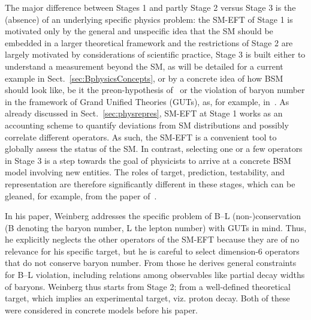 The major difference between Stages 1 and partly Stage 2 versus Stage 3 is the (absence) of an underlying specific physics problem:
the SM-EFT of Stage 1 is motivated only by the general and unspecific idea that the SM should be embedded in a larger theoretical framework and the restrictions of Stage 2 are largely motivated by considerations of scientific practice, Stage 3 is built either to understand a measurement beyond the SM, as will be detailed for a current example in Sect.~\ref{sec:BphysicsConcepts}, or by a concrete idea of how BSM should look like, be it the preon-hypothesis of~\cite{Eichten:1983hw} or the violation of baryon number in the framework of Grand Unified Theories (GUTs), as, for example, in~\cite{Weinberg:1979sa}.   
As already discussed in Sect.~\ref{sec:physrepres},
SM-EFT at Stage 1 works as an accounting scheme to quantify deviations
from SM distributions and possibly correlate different operators.
As such, the SM-EFT is a convenient tool to globally assess the status of the SM.
In contrast, selecting one or a few operators in Stage 3 is a step towards the goal of physicists to arrive at a concrete BSM model involving new entities.
The roles of target, prediction, testability, and representation are therefore significantly different in these stages, which can be gleaned, for example, from the paper of~\cite{Weinberg:1979sa}. %

In his paper, Weinberg addresses the specific problem of B--L (non-)conservation (B denoting the baryon number, L the lepton number) with GUTs in mind.
Thus, he explicitly neglects the other operators of the SM-EFT because they are of no relevance for his specific target, but he is careful to select dimension-6 operators that do not conserve baryon number. 
From those he derives general constraints for B--L violation, including relations among observables like partial decay widths of baryons.
Weinberg thus starts from Stage 2; from a well-defined theoretical target, which implies an experimental target, viz. proton decay.
Both of these were considered in concrete models before his paper.

